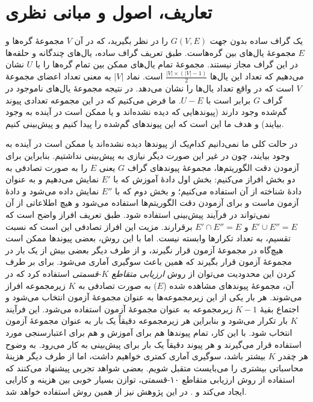 \section{تعاریف، اصول و مبانی نظری}
یک گراف ساده بدون جهت $G(V, E)$ را در نظر بگیرید، که در آن $V$ مجموعهٔ گره‌ها و $E$ مجموعهٔ یال‌های بین گره‌هاست. طبق تعریف گراف ساده، یال‌های چندگانه و حلقه‌ها در این گراف مجاز نیستند. مجموعهٔ تمام یال‌های ممکن بین تمام گره‌ها را با $U$ نشان می‌دهیم که تعداد این یال‌ها
$\frac{|V|\times(|V|-1)}{2}$
است. نماد $|V|$ به معنی تعداد اعضای مجموعهٔ $V$ است که در واقع تعداد یال‌ها را نشان می‌دهد. در نتیجه مجموعهٔ یال‌های ناموجود در گراف $G$ برابر است با $U - E$. ما فرض می‌کنیم که در این مجموعه تعدادی پیوند گم‌شده وجود دارند (پیوندهایی که دیده نشده‌اند و یا ممکن است در آینده به وجود بیایند) و هدف ما این است که این پیوندهای گم‌شده را پیدا کنیم و پیش‌بینی کنیم.

در حالت کلی ما نمی‌دانیم کدام‌یک از پیوندها دیده نشده‌اند یا ممکن است در آینده به وجود بیایند، چون در غیر این صورت دیگر نیازی به پیش‌بینی نداشتیم. بنابراین برای آزمودن دقت الگوریتم‌ها، مجموعه‌ٔ پیوندهای گراف $G$ یعنی $E$ را به صورت تصادفی به دو بخش افراز می‌کنیم: بخش اول دادهٔ آموزش که با $E'$ نمایش می‌دهیم و به عنوان دادهٔ شناخته از آن استفاده می‌کنیم؛ و بخش دوم که با $E''$ نمایش داده می‌شود و داده‌ٔ آزمون ماست و برای آزمودن دقت الگوریتم‌ها استفاده می‌شود و هیچ اطلاعاتی از آن نمی‌تواند در فرآیند پیش‌بینی استفاده شود. طبق تعریف افراز واضح است که $E' \cup E'' = E$ و $E' \cap E'' = E$ برقرارند. مزیت این افراز تصادفی این است که نسبت تقسیم، به تعداد تکرارها وابسته نیست. اما با این روش، بعضی پیوندها ممکن است هیچ‌گاه در مجموعهٔ آزمون قرار نگیرند، و از طرف دیگر بعضی بیش از یک بار در مجموعهٔ آزمون قرار بگیرند که همین باعث سوگیری آماری می‌شود. برای بر طرف کردن این محدودیت می‌توان از روش \textit{ارزیابی متقاطع $K$-قسمتی} استفاده کرد که در آن، مجموعه‌ٔ پیوند‌های مشاهده شده ($E$) به صورت تصادفی به $K$ زیرمجموعه افراز می‌شوند. هر بار یکی از این زیرمجموعه‌ها به عنوان مجموعهٔ آزمون انتخاب می‌شود و اجتماع بقیهٔ $K - 1$ زیرمجموعه به عنوان مجموعهٔ آزمون استفاده می‌شود. این فرآیند $K$ بار تکرار می‌شود و بنابراین هر زیرمجموعه دقیقاً یک بار به عنوان مجموعهٔ آزمون انتخاب شود. با این کار، تمام پیوندها هم برای آموزش و هم برای اعتبارسنجی مورد استفاده قرار می‌گیرند و هر پیوند دقیقاً یک بار برای پیش‌بینی به کار می‌رود. به وضوح هر چقدر $K$ بیشتر باشد، سوگیری آماری کمتری خواهیم داشت، اما از طرف دیگر هزینهٔ محاسباتی بیشتری را می‌بایست متقبل شویم. بعضی شواهد تجربی پیشنهاد می‌کنند که استفاده از روش ارزیابی متقاطع ۱۰-قسمتی، توازن بسیار خوبی بین هزینه و کارایی ایجاد می‌کند\cite{breiman1992submodel} و \cite{kohavi1995study}. در این پژوهش نیز از همین روش استفاده خواهد شد.

